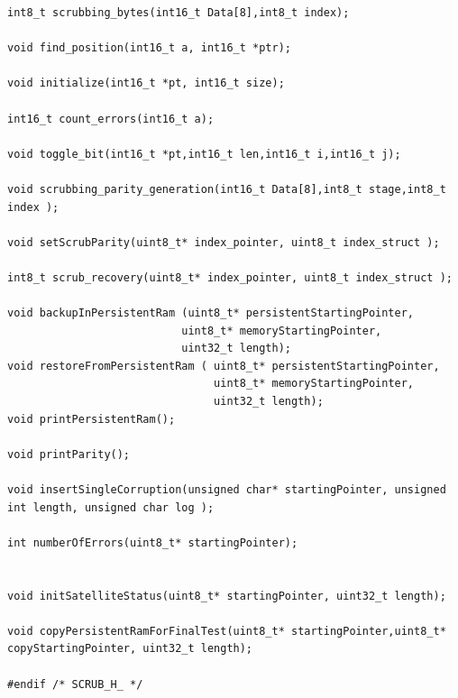 \documentclass[LaM,binding=0.6cm,oneside]{../sapthesis}
\begin{document}
\begin{lstlisting}
int8_t scrubbing_bytes(int16_t Data[8],int8_t index);

void find_position(int16_t a, int16_t *ptr);

void initialize(int16_t *pt, int16_t size);

int16_t count_errors(int16_t a);

void toggle_bit(int16_t *pt,int16_t len,int16_t i,int16_t j);

void scrubbing_parity_generation(int16_t Data[8],int8_t stage,int8_t index );

void setScrubParity(uint8_t* index_pointer, uint8_t index_struct );

int8_t scrub_recovery(uint8_t* index_pointer, uint8_t index_struct );

void backupInPersistentRam (uint8_t* persistentStartingPointer,
                           uint8_t* memoryStartingPointer,
                           uint32_t length);
void restoreFromPersistentRam ( uint8_t* persistentStartingPointer,
                                uint8_t* memoryStartingPointer,
                                uint32_t length);
void printPersistentRam();

void printParity();

void insertSingleCorruption(unsigned char* startingPointer, unsigned int length, unsigned char log );

int numberOfErrors(uint8_t* startingPointer);


void initSatelliteStatus(uint8_t* startingPointer, uint32_t length);

void copyPersistentRamForFinalTest(uint8_t* startingPointer,uint8_t* copyStartingPointer, uint32_t length);

#endif /* SCRUB_H_ */
\end{lstlisting}
\end{document}
